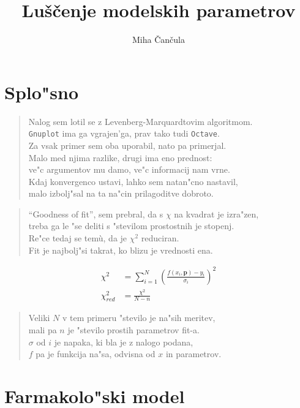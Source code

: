 \documentclass[a4paper,10pt]{article}
\title{Lu\v s\v cenje modelskih parametrov}
\author{Miha \v Can\v cula}
\begin{document}
\maketitle

\section{Splo"sno}
\begin{verse}
Nalog sem lotil se z Levenberg-Marquardtovim algoritmom. \\
\texttt{Gnuplot} ima ga vgrajen'ga, prav tako tudi \texttt{Octave}. \\
Za vsak primer sem oba uporabil, nato pa primerjal. \\
Malo med njima razlike, drugi ima eno prednost: \\
ve"c argumentov mu damo, ve"c informacij nam vrne. \\ 
Kdaj konvergenco ustavi, lahko sem natan"cno nastavil, \\
malo izbolj"sal na ta na"cin prilagoditve dobroto. 
\end{verse}

\begin{verse}
 ``Goodness of fit'', sem prebral, da s $\chi$ na kvadrat je izra"zen, \\
treba ga le "se deliti s "stevilom prostostnih je stopenj. \\
Re"ce tedaj se tem\`u, da je $\chi^2$ reduciran. \\
Fit je najbolj"si takrat, ko blizu je vrednosti ena. \\
\end{verse}

\begin{align}
 \chi^2 &= \sum_{i=1}^N \left(\frac{f(x_i, \mathbf{p}) - y_i}{\sigma_i}\right)^2 \\
 \chi^2_{red} &= \frac{\chi^2}{N-n}
\end{align}

\begin{verse}
 Veliki $N$ v tem primeru "stevilo je na"sih meritev, \\
 mali pa $n$ je "stevilo prostih parametrov fit-a. \\
 $\sigma$ od $i$ je napaka, ki bla je z nalogo podana, \\
 $f$ pa je funkcija na"sa, odvisna od $x$ in parametrov. \\
\end{verse}

\section{Farmakolo"ski model}
\end{document}
